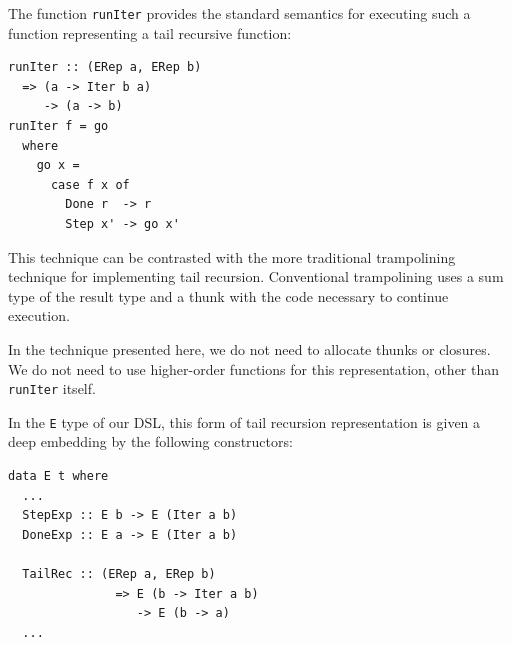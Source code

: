 \documentclass[runningheads, a4paper]{llncs}
\newcommand{\ttt}{\texttt}
\newcommand{\showtodos}{}  %
\newenvironment{todo}
  {\ifthenelse{\isundefined{\showtodos}}{\comment}{\begin{tcolorbox}
    \textbf{TODO}:}}
  {\ifthenelse{\isundefined{\showtodos}}{\endcomment}{\end{tcolorbox}}
  }
\begin{document}
The function \ttt{runIter} provides the standard semantics for executing such a
function representing a tail recursive function:

\begin{lstlisting}
runIter :: (ERep a, ERep b)
  => (a -> Iter b a)
     -> (a -> b)
runIter f = go
  where
    go x =
      case f x of
        Done r  -> r
        Step x' -> go x'
\end{lstlisting}








This technique can be contrasted with the more traditional trampolining
technique for implementing tail recursion. Conventional trampolining uses a
sum type of the result type and a thunk with the code necessary to continue
execution.~\cite{Ganz:99:Trampolined}

In the technique presented here, we do not need to allocate thunks or closures.
We do not need to use higher-order functions for this representation, other than \ttt{runIter} itself.

In the \ttt{E} type of our DSL, this form of tail recursion representation is
given a deep embedding by the following constructors:

\begin{lstlisting}
data E t where
  ...
  StepExp :: E b -> E (Iter a b)
  DoneExp :: E a -> E (Iter a b)

  TailRec :: (ERep a, ERep b)
               => E (b -> Iter a b)
                  -> E (b -> a)
  ...
\end{lstlisting}
\end{document}
